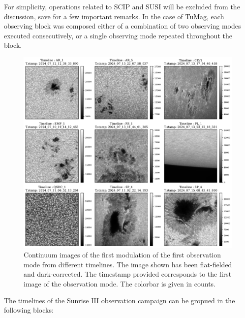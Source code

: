 For simplicity, operations related to SCIP and SUSI will be excluded from the discussion, save for a few important remarks. In the case of TuMag, each observing block was composed either of a combination of two observing modes executed consecutively, or a single observing mode repeated throughout the block.  

\begin{figure}
  \includegraphics[width=\textwidth]{figures/Pipeline/timelines_Examples.pdf}
  \caption{
    Continuum images of the first modulation of the first observation mode from different timelines. The image shown has been flat-fielded and dark-corrected. The timestamp provided corresponds to the first image of the observation mode. The colorbar is given in counts.}
    \label{fig_pipeline: timeline_examples}
\end{figure}

The timelines of the Sunrise III observation campaign can be gropued in the following blocks: 

